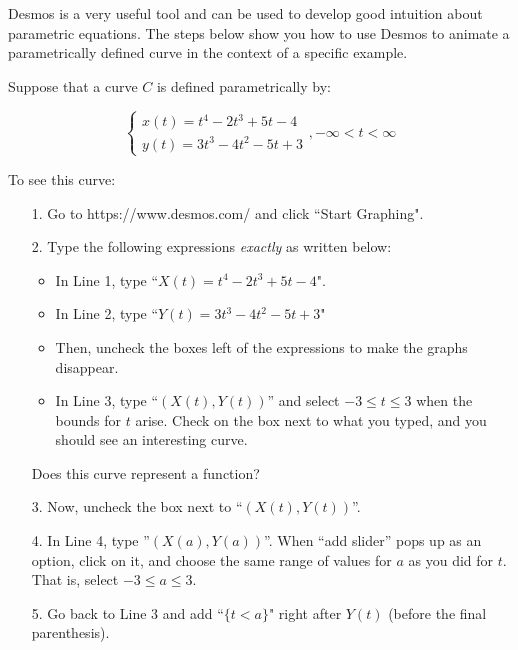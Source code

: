 \documentclass{ximera}
\author{Jim Talamo}
\begin{document}
\begin{exercise}
Desmos is a very useful tool and can be used to develop good intuition about parametric equations.  The steps below show you how to use Desmos to animate a parametrically defined curve in the context of a specific example.

Suppose that a curve $C$ is defined parametrically by:

\[
 \begin{cases}
x(t)=  t^4-2t^3+5t-4\\
y(t)=  3t^3-4t^2-5t+3
\end{cases} 
, -\infty < t < \infty
\]

To see this curve:

\begin{itemize}
\item[1.] Go to https://www.desmos.com/ and click ``Start Graphing".
\item[2.] Type the following expressions \emph{exactly} as written below:
\begin{itemize}
\item In Line 1, type ``$X(t) = t^4-2t^3+5t-4$".  
\item In Line 2, type ``$Y(t) = 3t^3-4t^2-5t+3$"
\item Then, uncheck the boxes left of the expressions to make the graphs disappear.
\item In Line 3, type ``$(X(t),Y(t))$'' and select $-3\leq t \leq3$ when the bounds for $t$ arise.  Check on the box next to what you typed, and you should see an interesting curve.
\end{itemize}

Does this curve represent a function?

\begin{multipleChoice}
\end{multipleChoice}

\item[3.] Now, uncheck the box next to ``$(X(t),Y(t))$''.
\item[4.] In Line 4, type ''$(X(a),Y(a))$''.  When ``add slider'' pops up as an option, click on it, and choose the same range of values for $a$ as you did for $t$.  That is, select $-3 \leq a \leq 3$.
\item[5.] Go back to Line 3 and add ``$\{t<a\}$" right after $Y(t)$ (before the final parenthesis).  


\end{itemize}
\end{exercise}
\end{document}
